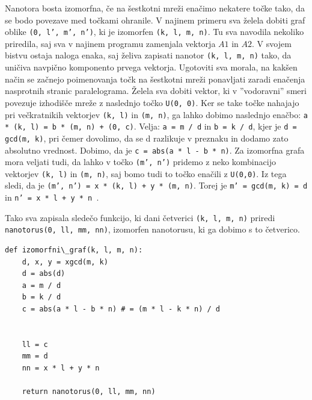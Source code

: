 \documentclass[a4paper, 10 pt, titlepage]{article}
\begin{document}
Nanotora bosta izomorfna, če na šestkotni mreži enačimo nekatere točke tako, da se bodo povezave med točkami ohranile. V najinem primeru sva želela dobiti graf oblike \texttt{(0, l', m', n')}, ki je izomorfen \texttt{(k, l, m, n)}. Tu sva navodila nekoliko priredila, saj sva v najinem programu zamenjala vektorja $A1$ in $A2$. V svojem bistvu ostaja naloga enaka, saj želiva zapisati nanotor \texttt{(k, l, m, n)} tako, da uničiva navpično komponento prvega vektorja. 
Ugotoviti sva morala, na kakšen način se začnejo poimenovanja točk na šestkotni mreži ponavljati zaradi enačenja nasprotnih stranic paralelograma. Želela sva dobiti vektor, ki v ''vodoravni'' smeri povezuje izhodišče mreže z naslednjo točko \texttt{U(0, 0)}. Ker se take točke nahajajo pri večkratnikih vektorjev \texttt{(k, l)} in \texttt{(m, n)}, ga lahko dobimo naslednjo enačbo: \texttt{a * (k, l) = b * (m, n) + (0, c)}. Velja: \texttt{a = m / d} in \texttt{b = k / d}, kjer je \texttt{d = gcd(m, k)}, pri čemer dovolimo, da se d razlikuje v preznaku in dodamo zato absolutno vrednost. Dobimo, da je \texttt{c = abs(a * l - b * n)}.
Za izomorfna grafa mora veljati tudi, da lahko v točko \texttt{(m', n')} pridemo z neko kombinacijo vektorjev \texttt{(k, l)} in \texttt{(m, n)}, saj bomo tudi to točko enačili z \texttt{U(0,0)}. Iz tega sledi, da je \texttt{(m', n') = x * (k, l) + y * (m, n)}. Torej je \texttt{m' = gcd(m, k) = d} in \texttt{n' = x * l + y * n }.

Tako sva zapisala sledečo funkcijo, ki dani četverici \texttt{(k, l, m, n)} priredi \texttt{nanotorus(0, ll, mm, nn)}, izomorfen nanotorusu, ki ga dobimo s to četverico.

\begin{verbatim}
def izomorfni\_graf(k, l, m, n):
    d, x, y = xgcd(m, k)
    d = abs(d)
    a = m / d
    b = k / d
    c = abs(a * l - b * n) # = (m * l - k * n) / d
    
    
    ll = c
    mm = d
    nn = x * l + y * n 
    
    return nanotorus(0, ll, mm, nn)
\end{verbatim}
\end{document}
